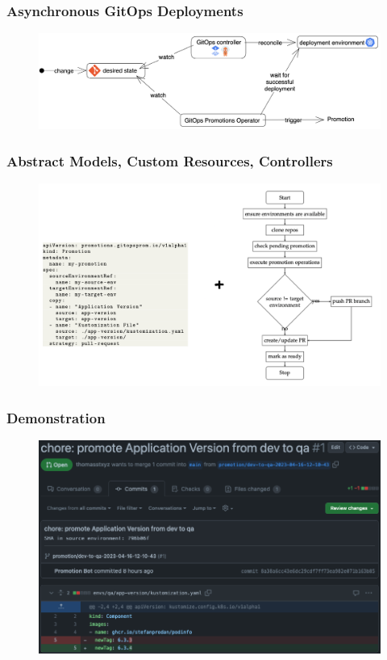 \documentclass{beamer}
\begin{document}
\begin{frame}
	\frametitle{Asynchronous GitOps Deployments}
	\begin{figure}[h]
		\centering
		\includegraphics[width=1.0\linewidth]{assets/async-gitops-promo-arch.png}
		\label{fig:async-gitops-promo-arch}	
	\end{figure}
\end{frame}
\begin{frame}
	\frametitle{Abstract Models, Custom Resources, Controllers}
	\begin{figure}[h]
		\centering
		\includegraphics[width=1.0\linewidth]{assets/cr-plus-ctrl-logic-slide.png}
		\label{fig:cr-plus-ctrl-logic-slide}	
	\end{figure}
\end{frame}
\begin{frame}
	\frametitle{Demonstration}
	
	\begin{figure}[h]
		\centering
		\includegraphics[width=1.0\linewidth]{assets/prom-pr-dev-to-qa.png}
		\label{fig:prom-pr-dev-to-qa}	
	\end{figure}
	
\end{frame}
\end{document}
